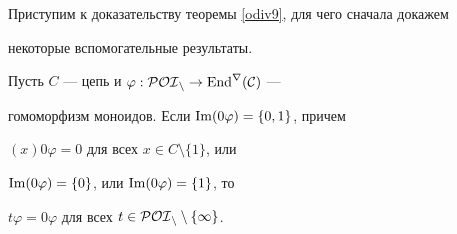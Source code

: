 Приступим к доказательству теоремы \ref{odiv9}, для чего сначала докажем


некоторые вспомогательные результаты.





\begin{lems} \label{odiv1}


Пусть $C$ --- цепь и $\varphi:\cal{POI}_n\rightarrow\operatorname{End}^r(C)$ ---


гомоморфизм моноидов. Если $\operatorname{Im}(0\varphi)=\{0,1\}$, причем


$(x)0\varphi=0$ для всех $x\in C\setminus\{1\}$, или


$\operatorname{Im}(0\varphi)=\{0\}$, или $\operatorname{Im}(0\varphi)=\{1\}$, то


$t\varphi=0\varphi$ для всех $t\in\cal{POI}_n\setminus\{1\}$.


\end{lems}






